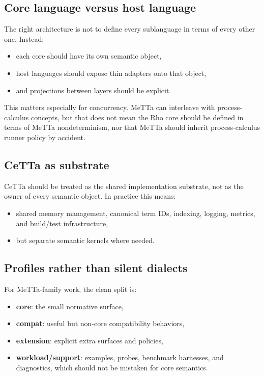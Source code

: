 \documentclass[11pt]{article}
\begin{document}
\subsection{Core language versus host language}
The right architecture is not to define every sublanguage in terms of every other one. Instead:
\begin{itemize}
  \item each core should have its own semantic object,
  \item host languages should expose thin adapters onto that object,
  \item and projections between layers should be explicit.
\end{itemize}

This matters especially for concurrency. MeTTa can interleave with process-calculus concepts, but that does not mean the Rho core should be defined in terms of MeTTa nondeterminism, nor that MeTTa should inherit process-calculus runner policy by accident.

\subsection{CeTTa as substrate}
CeTTa should be treated as the shared implementation substrate, not as the owner of every semantic object. In practice this means:
\begin{itemize}
  \item shared memory management, canonical term IDs, indexing, logging, metrics, and build/test infrastructure,
  \item but separate semantic kernels where needed.
\end{itemize}

\subsection{Profiles rather than silent dialects}
For MeTTa-family work, the clean split is:
\begin{itemize}
  \item \textbf{core}: the small normative surface,
  \item \textbf{compat}: useful but non-core compatibility behaviors,
  \item \textbf{extension}: explicit extra surfaces and policies,
  \item \textbf{workload/support}: examples, probes, benchmark harnesses, and diagnostics, which should not be mistaken for core semantics.
\end{itemize}
\end{document}
